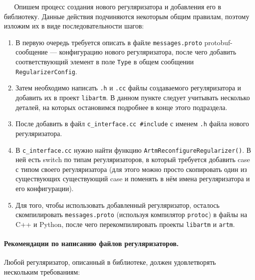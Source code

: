 $\quad\;\:$Опишем процесс создания нового регуляризатора и добавления его в библиотеку. Данные действия подчиняются некоторым общим правилам, поэтому изложим их в виде последовательности шагов:

\begin{enumerate}
	\item В первую очередь требуется описать в файле \verb'messages.proto' protobuf-сообщение ---  конфигурацию нового регуляризатора, после чего добавить соответствующий элемент в поле \verb'Type' в общем сообщении \verb'RegularizerConfig'.
	
	\item Затем необходимо написать \verb'.h' и \verb'.cc' файлы создаваемого регуляризатора и добавить их в проект \verb'libartm'. В данном пункте следует учитывать несколько деталей, на которых остановимся подробнее в конце этого подраздела.
	
	\item После добавить в файл \verb'c_interface.cc #include' с именем \verb'.h' файла нового регуляризатора.
	
	\item В  \verb'c_interface.cc' нужно найти функцию \verb'ArtmReconfigureRegularizer()'. В ней есть switch по типам регуляризаторов, в который требуется добавить case с типом своего регуляризатора (для этого можно просто скопировать один из существующих существующий case и поменять в нём имена регуляризатора и его конфигурации).
	
	\item Для того, чтобы использовать добавленный регуляризатор, осталось скомпилировать \verb'messages.proto' (используя компилятор \verb'protoc') в файлы на C++ и Python, после чего перекомпилировать проекты \verb'libartm' и \verb'artm'.
\end{enumerate}

\paragraph{Рекомендации по написанию файлов регуляризаторов.} Любой регуляризатор, описанный в библиотеке, должен удовлетворять нескольким требованиям:

